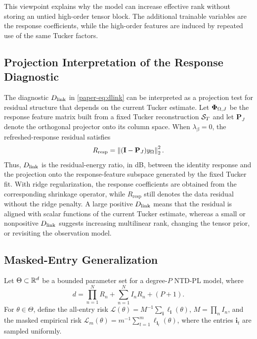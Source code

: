 This viewpoint explains why the model can increase effective rank without
storing an untied high-order tensor block. The
additional trainable variables are the response coefficients, while the
high-order features are induced by repeated use of the same Tucker factors.

\subsection{Projection Interpretation of the Response Diagnostic}

The diagnostic $D_{\mathrm{link}}$ in \eqref{paper-eq:dlink} can be interpreted as a projection
test for residual structure that depends on the current Tucker estimate. Let
$\boldsymbol{\Phi}_{\Omega,J}$ be the response feature matrix built from a fixed Tucker
reconstruction $\mathcal{S}_T$ and let $\mathbf{P}_J$ denote the orthogonal projector
onto its column space. When $\lambda_\beta=0$, the refreshed-response residual
satisfies
\begin{equation}
  R_{\mathrm{resp}}
  =
  \left\lVert (\mathbf{I}-\mathbf{P}_J)y_\Omega \right\rVert_2^2.
\end{equation}
Thus, $D_{\mathrm{link}}$ is the residual-energy ratio, in dB, between the identity
response and the projection onto the response-feature subspace generated by the
fixed Tucker fit. With ridge regularization, the response coefficients are
obtained from the corresponding shrinkage operator, while $R_{\mathrm{resp}}$
still denotes the data residual without the ridge penalty. A large positive
$D_{\mathrm{link}}$ means that the residual is aligned with scalar functions of the current
Tucker estimate, whereas a small or nonpositive $D_{\mathrm{link}}$ suggests increasing
multilinear rank, changing the tensor prior, or revisiting the observation model.

\subsection{Masked-Entry Generalization}

Let \(\Theta\subset\mathbb{R}^d\) be a bounded parameter set for a degree-\(P\)
NTD-PL model, where
\begin{equation}
  d=
  \prod_{n=1}^{N}R_n
  +
  \sum_{n=1}^{N}I_nR_n
  +
  (P+1).
\end{equation}
For \(\theta\in\Theta\), define the all-entry risk
\(\mathcal{L}(\theta)=M^{-1}\sum_{\mathbf{i}}\ell_{\mathbf{i}}(\theta)\),
\(M=\prod_n I_n\), and the masked empirical risk
\(\widehat{\mathcal{L}}_m(\theta)=m^{-1}\sum_{t=1}^{m}
\ell_{\mathbf{i}_t}(\theta)\), where the entries
\(\mathbf{i}_t\) are sampled uniformly.

